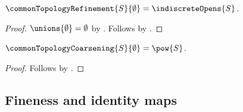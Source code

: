 \begin{proposition}\label{empty_common_topology_refinement}
    $\commonTopologyRefinement{S}{\emptyset}=\indiscreteOpens{S}$.
\end{proposition}
\begin{proof}
    $\unions{\emptyset}=\emptyset$ by .
    Follows by
        .
\end{proof}

\begin{proposition}\label{empty_common_topology_coarsening}
    $\commonTopologyCoarsening{S}{\emptyset}=\pow{S}$.
\end{proposition}
\begin{proof}
    Follows by
        .
\end{proof}

\subsection{Fineness and identity maps}

